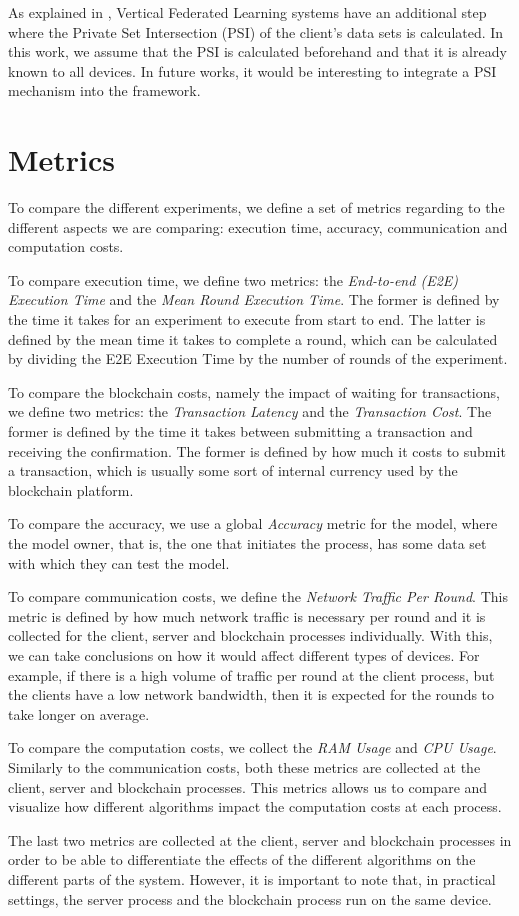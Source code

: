 As explained in , Vertical Federated Learning systems have an additional step where the Private Set Intersection (PSI) of the client's data sets is calculated. In this work, we assume that the PSI is calculated beforehand and that it is already known to all devices. In future works, it would be interesting to integrate a PSI mechanism into the framework.

\section{Metrics}\label{meth:metrics}

To compare the different experiments, we define a set of metrics regarding to the different aspects we are comparing: execution time, accuracy, communication and computation costs.

To compare execution time, we define two metrics: the \textit{End-to-end (E2E) Execution Time} and the \textit{Mean Round Execution Time}. The former is defined by the time it takes for an experiment to execute from start to end. The latter is defined by the mean time it takes to complete a round, which can be calculated by dividing the E2E Execution Time by the number of rounds of the experiment.

To compare the blockchain costs, namely the impact of waiting for transactions, we define two metrics: the \textit{Transaction Latency} and the \textit{Transaction Cost}. The former is defined by the time it takes between submitting a transaction and receiving the confirmation. The former is defined by how much it costs to submit a transaction, which is usually some sort of internal currency used by the blockchain platform.

To compare the accuracy, we use a global \textit{Accuracy} metric for the model, where the model owner, that is, the one that initiates the process, has some data set with which they can test the model.

To compare communication costs, we define the \textit{Network Traffic Per Round}. This metric is defined by how much network traffic is necessary per round and it is collected for the client, server and blockchain processes individually. With this, we can take conclusions on how it would affect different types of devices. For example, if there is a high volume of traffic per round at the client process, but the clients have a low network bandwidth, then it is expected for the rounds to take longer on average.

To compare the computation costs, we collect the \textit{RAM Usage} and \textit{CPU Usage}. Similarly to the communication costs, both these metrics are collected at the client, server and blockchain processes. This metrics allows us to compare and visualize how different algorithms impact the computation costs at each process.

The last two metrics are collected at the client, server and blockchain processes in order to be able to differentiate the effects of the different algorithms on the different parts of the system. However, it is important to note that, in practical settings, the server process and the blockchain process run on the same device.
